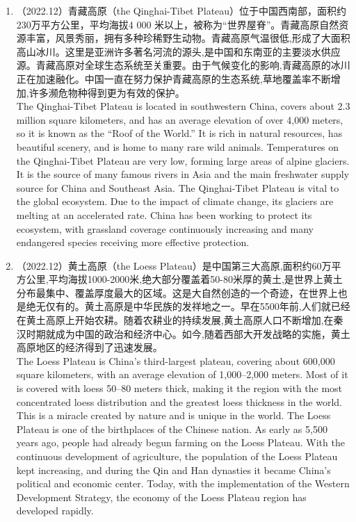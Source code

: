 ﻿\documentclass[lang=cn,11pt]{elegantbook}
\begin{document}
\begin{enumerate}
    \item （2022.12）青藏高原（the Qinghai-Tibet Plateau）位于中国西南部，面积约230万平方公里，平均海拔4 000 米以上，被称为“世界屋脊”。青藏高原自然资源丰富，风景秀丽，拥有多种珍稀野生动物。青藏高原气温很低,形成了大面积高山冰川。这里是亚洲许多著名河流的源头,是中国和东南亚的主要淡水供应源。青藏高原对全球生态系统至关重要。由于气候变化的影响,青藏高原的冰川正在加速融化。中国一直在努力保护青藏高原的生态系统,草地覆盖率不断增加,许多濒危物种得到更为有效的保护。\\The Qinghai-Tibet Plateau is located in southwestern China, covers about 2.3 million square kilometers, and has an average elevation of over 4,000 meters, so it is known as the “Roof of the World.” It is rich in natural resources, has beautiful scenery, and is home to many rare wild animals. Temperatures on the Qinghai-Tibet Plateau are very low, forming large areas of alpine glaciers. It is the source of many famous rivers in Asia and the main freshwater supply source for China and Southeast Asia. The Qinghai-Tibet Plateau is vital to the global ecosystem. Due to the impact of climate change, its glaciers are melting at an accelerated rate. China has been working to protect its ecosystem, with grassland coverage continuously increasing and many endangered species receiving more effective protection.
    \item （2022.12）黄土高原（the Loess Plateau）是中国第三大高原,面积约60万平方公里,平均海拔1000-2000米,绝大部分覆盖着50-80米厚的黄土,是世界上黄土分布最集中、覆盖厚度最大的区域。这是大自然创造的一个奇迹，在世界上也是绝无仅有的。黄土高原是中华民族的发祥地之一。早在5500年前,人们就已经在黄土高原上开始农耕。随着农耕业的持续发展,黄土高原人口不断增加,在秦汉时期就成为中国的政治和经济中心。如今,随着西部大开发战略的实施，黄土高原地区的经济得到了迅速发展。\\The Loess Plateau is China’s third-largest plateau, covering about 600,000 square kilometers, with an average elevation of 1,000–2,000 meters. Most of it is covered with loess 50–80 meters thick, making it the region with the most concentrated loess distribution and the greatest loess thickness in the world. This is a miracle created by nature and is unique in the world. The Loess Plateau is one of the birthplaces of the Chinese nation. As early as 5,500 years ago, people had already begun farming on the Loess Plateau. With the continuous development of agriculture, the population of the Loess Plateau kept increasing, and during the Qin and Han dynasties it became China’s political and economic center. Today, with the implementation of the Western Development Strategy, the economy of the Loess Plateau region has developed rapidly.

\end{enumerate}
\end{document}
